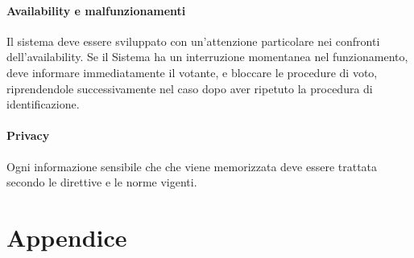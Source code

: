 \documentclass{report}
\begin{document}
\subsubsection{Availability e malfunzionamenti}
Il sistema deve essere sviluppato con un'attenzione particolare nei confronti dell'availability. Se il Sistema ha un interruzione momentanea nel funzionamento, deve informare immediatamente il votante, e bloccare le procedure di voto, riprendendole successivamente nel caso dopo aver ripetuto la procedura di identificazione.

\subsubsection{Privacy}
Ogni informazione sensibile che che viene memorizzata deve essere trattata secondo le direttive e le norme vigenti.  

\chapter{Appendice}
\end{document}
